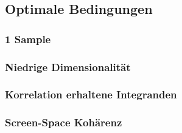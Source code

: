 \subsection{Optimale Bedingungen}

\subsubsection{1 Sample}

\subsubsection{Niedrige Dimensionalität}

\subsubsection{Korrelation erhaltene Integranden}

\subsubsection{Screen-Space Kohärenz}


